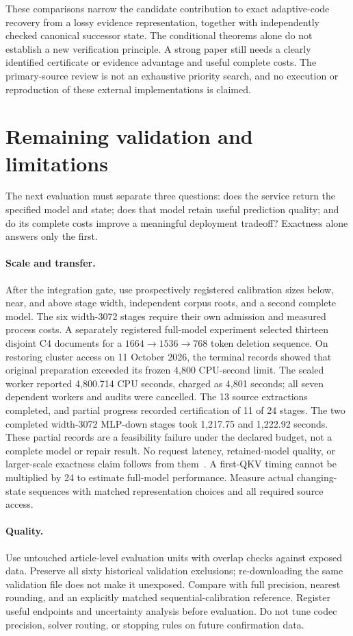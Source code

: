 \documentclass[10pt,twocolumn,letterpaper]{article}
\begin{document}
These comparisons narrow the candidate contribution to exact adaptive-code
recovery from a lossy evidence representation, together with independently
checked canonical successor state. The conditional theorems alone do not
establish a new verification principle. A strong paper still needs a clearly
identified certificate or evidence advantage and useful complete costs. The
primary-source review is not an exhaustive priority search, and no execution or
reproduction of these external implementations is claimed.

\section{Remaining validation and limitations}
The next evaluation must separate three questions: does the service return the
specified model and state; does that model retain useful prediction quality; and
do its complete costs improve a meaningful deployment tradeoff? Exactness alone
answers only the first.

\paragraph{Scale and transfer.}
After the integration gate, use prospectively registered calibration sizes below,
near, and above stage width, independent corpus roots, and a second complete model.
The six width-3072 stages require their own admission and measured process costs.
A separately registered full-model experiment selected thirteen disjoint C4
documents for a $1664\to1536\to768$ token deletion sequence. On restoring
cluster access on 11 October 2026, the terminal records showed that original
preparation exceeded its frozen 4,800 CPU-second limit. The sealed worker
reported 4,800.714 CPU seconds, charged as 4,801 seconds; all seven dependent
workers and audits were cancelled. The 13 source extractions completed, and
partial progress recorded certification of 11 of 24 stages. The two completed
width-3072 MLP-down stages took 1,217.75 and 1,222.92 seconds. These partial
records are a feasibility failure under the declared budget, not a complete
model or repair result. No request latency, retained-model quality, or
larger-scale exactness claim follows from them~\cite{v49failure}.
A first-QKV timing cannot be multiplied by 24 to estimate full-model performance.
Measure actual changing-state sequences with matched representation choices and
all required source access.

\paragraph{Quality.}
Use untouched article-level evaluation units with overlap checks against exposed
data. Preserve all sixty historical validation exclusions; re-downloading the
same validation file does not make it unexposed. Compare with full precision,
nearest rounding, and an explicitly matched sequential-calibration reference.
Register useful endpoints and uncertainty analysis before evaluation. Do not tune
codec precision, solver routing, or stopping rules on future confirmation data.
\end{document}
